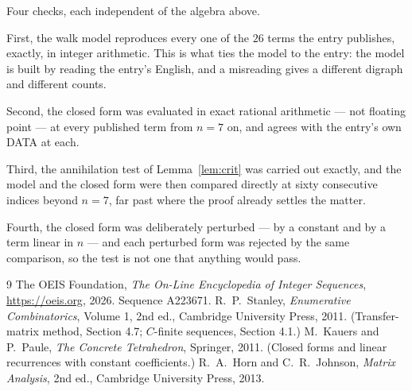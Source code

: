 \documentclass[11pt,a4paper]{article}
\theoremstyle{plain}
\theoremstyle{definition}
\begin{document}
Four checks, each independent of the algebra above.

First, the walk model reproduces every one of the $26$ terms the entry publishes,
exactly, in integer arithmetic. This is what ties the model to the entry: the model is built
by reading the entry's English, and a misreading gives a different digraph and different
counts.

Second, the closed form was evaluated in exact rational arithmetic --- not floating point ---
at every published term from $n=7$ on, and agrees with the entry's own DATA at each.

Third, the annihilation test of Lemma~\ref{lem:crit} was carried out exactly, and the model
and the closed form were then compared directly at sixty consecutive indices beyond
$n=7$, far past where the proof already settles the matter.

Fourth, the closed form was deliberately perturbed --- by a constant and by a term linear in
$n$ --- and each perturbed form was rejected by the same comparison, so the test is not one
that anything would pass.

\begin{thebibliography}{9}
 The OEIS Foundation, \emph{The On-Line Encyclopedia of Integer
Sequences}, \url{https://oeis.org}, 2026. Sequence A223671.
 R.~P.~Stanley, \emph{Enumerative Combinatorics}, Volume 1, 2nd ed.,
Cambridge University Press, 2011. (Transfer-matrix method, Section 4.7; $C$-finite sequences,
Section 4.1.)
 M.~Kauers and P.~Paule, \emph{The Concrete Tetrahedron}, Springer, 2011.
(Closed forms and linear recurrences with constant coefficients.)
 R.~A.~Horn and C.~R.~Johnson, \emph{Matrix Analysis}, 2nd ed., Cambridge
University Press, 2013.
\end{thebibliography}
\end{document}
